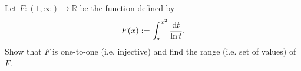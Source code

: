 \documentclass{article}
\begin{document}
	\setlength{\parindent}{0pt}
	Let $F:(1,\infty)\to\mathbb{R}$ be the function defined by
	$$F(x):=\int_{x}^{x^2}\frac{\textup{d}t}{\ln t}.$$
	Show that $F$ is one-to-one (i.e. injective) and find the range (i.e. set of values) of $F$.
\end{document}
